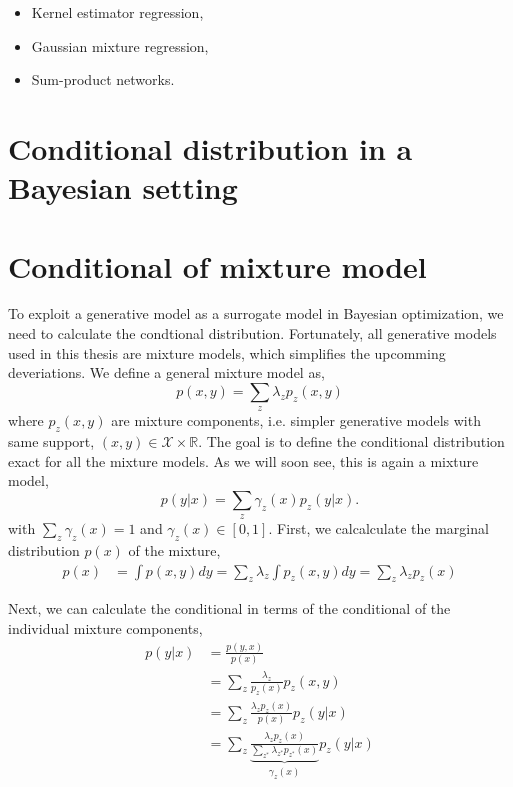 \begin{itemize}[noitemsep]
     \item Kernel estimator regression,
     \item Gaussian mixture regression,
     \item Sum-product networks.
 \end{itemize}

 \section{Conditional distribution in a Bayesian setting}\label{mixture_include_prior}
 




\section{Conditional of mixture model}\label{Conditional_mixture}
To exploit a generative model as a surrogate model in Bayesian optimization, we need to calculate
the condtional distribution. Fortunately, all generative models used in this thesis are mixture
models, which simplifies the upcomming deveriations. We define a general mixture model as, 
$$p(x,y) = \sum_z \lambda_z p_z(x,y)$$ where $p_z(x,y)$ are mixture components, i.e. simpler
generative models with same support, $(x,y) \in \mathcal{X}\times \mathbb{R}$. The goal is to define
the conditional distribution exact for all the mixture models. As we will soon see, this is again a
mixture model, 
$$p(y|x) = \sum_z \gamma_z(x) p_z(y|x).$$ with $\sum_z \gamma_z(x) = 1$ and $\gamma_z(x) \in [0,1]$.
First, we calcalculate the marginal distribution $p(x)$ of the mixture, 
\begin{align*}
    p(x) &= \int p(x,y) dy =\sum_{z} \lambda_z \int p_z(x,y) dy =\sum_{z} \lambda_z p_z(x)
\end{align*}

Next, we can calculate the conditional in terms of the conditional of the individual mixture
components, 
\begin{align}
    p(y|x) &= \frac{p(y,x)}{p(x)}\\
    &= \sum_{z} \frac{\lambda_z}{p_z(x)} p_z(x,y)\\
    &=  \sum_{z}  \frac{\lambda_z p_z(x)}{p(x)}p_z(y|x)\\
    &=  \sum_{z}  \underbrace{ \frac{\lambda_z p_z(x)}{\sum_{z^*} \lambda_{z^*} p_{z^*}(x)}}_{\gamma_z(x)} p_z(y|x)
\end{align}

